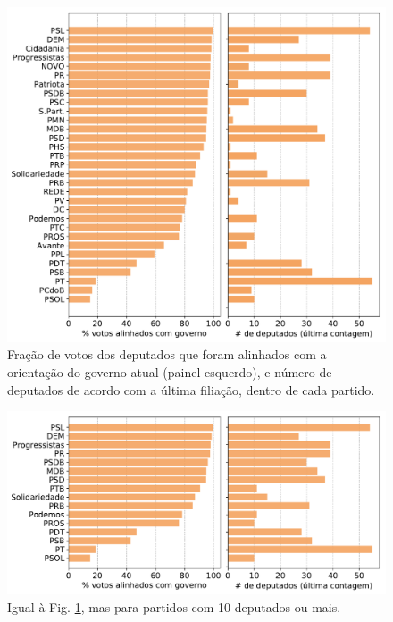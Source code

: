 \documentclass[12pt,a4paper]{article}
\begin{document}
\begin{figure}[H]
\centering
\includegraphics[width=1.0\textwidth]{graficos/apoio_ao_governo_partidos+tamanho_2019-05-09.pdf}
\caption{Fração de votos dos deputados que foram alinhados com a orientação do governo atual (painel esquerdo), e
  número de deputados de acordo com a última filiação, dentro de cada partido.}
\label{fig:apoio-governo-partido}
\end{figure} 

\begin{figure}[H]
\centering
\includegraphics[width=1.0\textwidth]{graficos/apoio_ao_governo_partidos10+tamanho_2019-05-09.pdf}
\caption{Igual à Fig. \ref{fig:apoio-governo-partido}, mas para partidos com 10 deputados ou mais.}
\label{fig:apoio-governo-partido-G}
\end{figure} 
\end{document}
